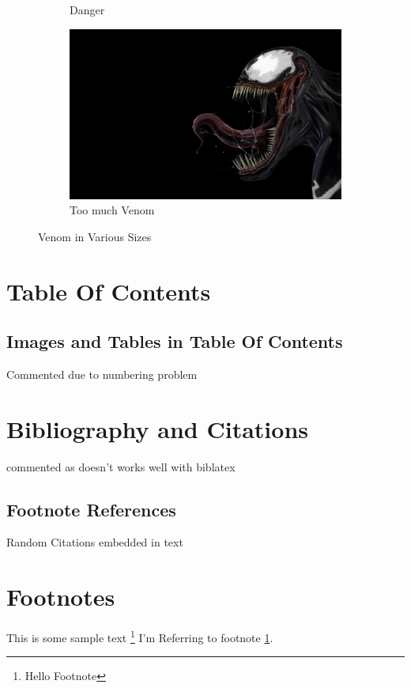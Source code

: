 \documentclass{article}
\begin{document}
\begin{figure}[h!]
\begin{subfigure}[b]{0.2\linewidth}
        \caption{Danger}
    \end{subfigure}
    \begin{subfigure}[b]{0.5\linewidth}
        \includegraphics[width=\linewidth]{img.jpg}
        \caption{Too much Venom}
    \end{subfigure}
    \caption{Venom in Various Sizes}
    \label{fig:Different Size venoms}
\end{figure}

\section{Table Of Contents}
\subsection{Images and Tables in Table Of Contents}
Commented due to numbering problem

\section{Bibliography and Citations}
commented as doesn't works well with biblatex

\subsection{Footnote References}
Random Citations \autocite{gree00} embedded in text

\section{Footnotes}
This is some sample text \footnote{\label{myfootnote}Hello Footnote}\newline
I'm Referring to footnote \ref{myfootnote}.
\end{document}
